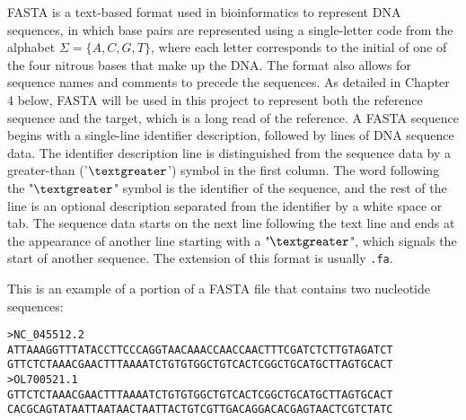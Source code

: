 FASTA is a text-based format used in bioinformatics to represent DNA sequences, in which base pairs are represented using a single-letter code from the alphabet \(\Sigma = \{A, C, G, T\}\),  where each letter corresponds to the initial of one of the four nitrous bases that make up the DNA. The format also allows for sequence names and comments to precede the sequences. As detailed in Chapter 4 below, FASTA will be used in this project to represent both the reference sequence and the target, which is a long read of the reference. A FASTA sequence begins with a single-line identifier description, followed by lines of DNA sequence data. The identifier description line is distinguished from the sequence data by a greater-than ('\( \textgreater \)') symbol in the first column. The word following the "\( \textgreater \)" symbol is the identifier of the sequence, and the rest of the line is an optional description separated from the identifier by a white space or tab. The sequence data starts on the next line following the text line and ends at the appearance of another line starting with a "\( \textgreater \)", which signals the start of another sequence. The extension of this format is usually \texttt{.fa}. 

\begin{example}
  This is an example of a portion of a FASTA file that contains two nucleotide sequences:
\begin{verbatim}
>NC_045512.2 
ATTAAAGGTTTATACCTTCCCAGGTAACAAACCAACCAACTTTCGATCTCTTGTAGATCT
GTTCTCTAAACGAACTTTAAAATCTGTGTGGCTGTCACTCGGCTGCATGCTTAGTGCACT
>OL700521.1 
GTTCTCTAAACGAACTTTAAAATCTGTGTGGCTGTCACTCGGCTGCATGCTTAGTGCACT
CACGCAGTATAATTAATAACTAATTACTGTCGTTGACAGGACACGAGTAACTCGTCTATC
\end{verbatim}
\end{example}



